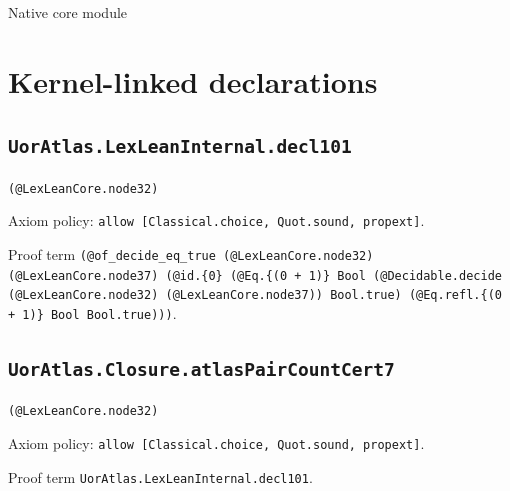 \documentclass[11pt]{article}
\begin{document}
\begin{center}{\LARGE Native core module}\end{center}
\section*{Kernel-linked declarations}
\subsection*{\texttt{UorAtlas.LexLeanInternal.decl101}}
\noindent\texttt{(@LexLeanCore.node32)}\par
\noindent Axiom policy: \texttt{allow [Classical.choice, Quot.sound, propext]}.\par
\noindent Proof term \texttt{(@of\_decide\_eq\_true (@LexLeanCore.node32) (@LexLeanCore.node37) (@id.\{0\} (@Eq.\{(0 + 1)\} Bool (@Decidable.decide (@LexLeanCore.node32) (@LexLeanCore.node37)) Bool.true) (@Eq.refl.\{(0 + 1)\} Bool Bool.true)))}.\par
\subsection*{\texttt{UorAtlas.Closure.atlasPairCountCert7}}
\noindent\texttt{(@LexLeanCore.node32)}\par
\noindent Axiom policy: \texttt{allow [Classical.choice, Quot.sound, propext]}.\par
\noindent Proof term \texttt{UorAtlas.LexLeanInternal.decl101}.\par
\end{document}
